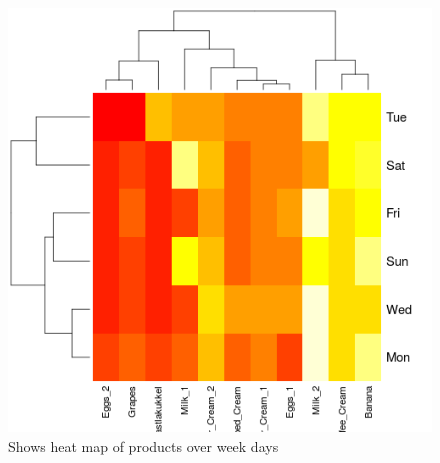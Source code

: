 \documentclass{article}
\begin{document}
\begin{figure}[H]
	\begin{center}
		\includegraphics[scale=1]{heatmapproductsvsdays.png}
	\end{center}
	\caption{Shows heat map of products over week days}
\end{figure}
\end{document}
